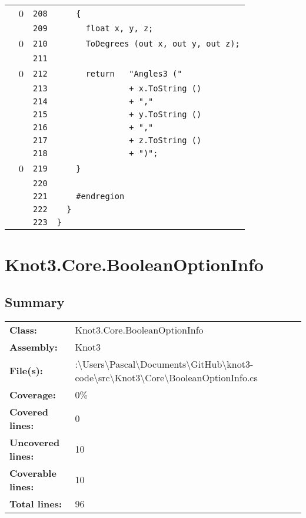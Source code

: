 \documentclass[a4paper,10pt]{article}
\begin{document}
\begin{longtable}[l]{lrrl}
\cellcolor{red} & 0 & \verb~208~ & \verb~    {~\\
\cellcolor{gray} &  & \verb~209~ & \verb~      float x, y, z;~\\
\cellcolor{red} & 0 & \verb~210~ & \verb~      ToDegrees (out x, out y, out z);~\\
\cellcolor{gray} &  & \verb~211~ & \verb~~\\
\cellcolor{red} & 0 & \verb~212~ & \verb~      return   "Angles3 ("~\\
\cellcolor{gray} &  & \verb~213~ & \verb~               + x.ToString ()~\\
\cellcolor{gray} &  & \verb~214~ & \verb~               + ","~\\
\cellcolor{gray} &  & \verb~215~ & \verb~               + y.ToString ()~\\
\cellcolor{gray} &  & \verb~216~ & \verb~               + ","~\\
\cellcolor{gray} &  & \verb~217~ & \verb~               + z.ToString ()~\\
\cellcolor{gray} &  & \verb~218~ & \verb~               + ")";~\\
\cellcolor{red} & 0 & \verb~219~ & \verb~    }~\\
\cellcolor{gray} &  & \verb~220~ & \verb~~\\
\cellcolor{gray} &  & \verb~221~ & \verb~    #endregion~\\
\cellcolor{gray} &  & \verb~222~ & \verb~  }~\\
\cellcolor{gray} &  & \verb~223~ & \verb~}~\\
\end{longtable}
\newpage
\section{Knot3.Core.BooleanOptionInfo}
\subsection{Summary}
\begin{longtable}[l]{ll}
\textbf{Class:} & Knot3.Core.BooleanOptionInfo\\
\textbf{Assembly:} & Knot3\\
\textbf{File(s):} & \begin{minipage}[t]{12cm}{:\textbackslash Users\textbackslash Pascal\textbackslash Documents\textbackslash GitHub\textbackslash knot3-code\textbackslash src\textbackslash Knot3\textbackslash Core\textbackslash BooleanOptionInfo.cs}\end{minipage} \\
\textbf{Coverage:} & 0\%\\
\textbf{Covered lines:} & 0\\
\textbf{Uncovered lines:} & 10\\
\textbf{Coverable lines:} & 10\\
\textbf{Total lines:} & 96\\
\end{longtable}
\end{document}
